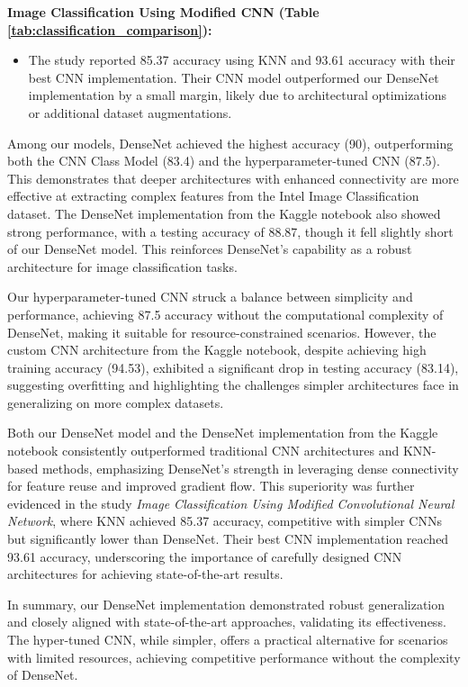 \textbf{Image Classification Using Modified CNN (Table \ref{tab:classification_comparison}):}
\begin{itemize}
    \item The study reported 85.37 accuracy using KNN and 93.61 accuracy with their best CNN implementation. Their CNN model outperformed our DenseNet implementation by a small margin, likely due to architectural optimizations or additional dataset augmentations.
\end{itemize}


Among our models, DenseNet achieved the highest accuracy (90), outperforming both the CNN Class Model (83.4) and the hyperparameter-tuned CNN (87.5). This demonstrates that deeper architectures with enhanced connectivity are more effective at extracting complex features from the Intel Image Classification dataset. The DenseNet implementation from the Kaggle notebook also showed strong performance, with a testing accuracy of 88.87, though it fell slightly short of our DenseNet model. This reinforces DenseNet's capability as a robust architecture for image classification tasks.

Our hyperparameter-tuned CNN struck a balance between simplicity and performance, achieving 87.5 accuracy without the computational complexity of DenseNet, making it suitable for resource-constrained scenarios. However, the custom CNN architecture from the Kaggle notebook, despite achieving high training accuracy (94.53), exhibited a significant drop in testing accuracy (83.14), suggesting overfitting and highlighting the challenges simpler architectures face in generalizing on more complex datasets.

Both our DenseNet model and the DenseNet implementation from the Kaggle notebook consistently outperformed traditional CNN architectures and KNN-based methods, emphasizing DenseNet’s strength in leveraging dense connectivity for feature reuse and improved gradient flow. This superiority was further evidenced in the study \textit{Image Classification Using Modified Convolutional Neural Network}, where KNN achieved 85.37 accuracy, competitive with simpler CNNs but significantly lower than DenseNet. Their best CNN implementation reached 93.61 accuracy, underscoring the importance of carefully designed CNN architectures for achieving state-of-the-art results.

In summary, our DenseNet implementation demonstrated robust generalization and closely aligned with state-of-the-art approaches, validating its effectiveness. The hyper-tuned CNN, while simpler, offers a practical alternative for scenarios with limited resources, achieving competitive performance without the complexity of DenseNet.
